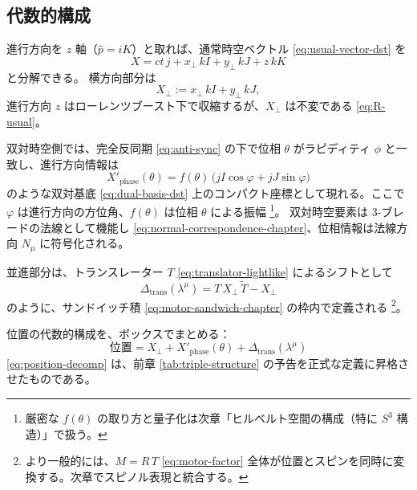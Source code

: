 \documentclass[dvipdfmx,a4paper,oneside]{jsbook}
\numberwithin{equation}{chapter}
\begin{document}
\subsection{代数的構成}

進行方向を \(z\) 軸（\(\hat{p} = iK\)）と取れば、通常時空ベクトル \eqref{eq:usual-vector-dst} を
\begin{equation}
  X = ct\, j + x_\perp\, kI + y_\perp\, kJ + z\, kK
  \label{eq:X-perp-decomp}
\end{equation}
と分解できる。
横方向部分は
\begin{equation}
  X_\perp := x_\perp\, kI + y_\perp\, kJ,
  \label{eq:X-perp}
\end{equation}
進行方向 \(z\) はローレンツブースト下で収縮するが、\(X_\perp\) は不変である \eqref{eq:R-usual}。

双対時空側では、完全反同期 \eqref{eq:anti-sync} の下で位相 \(\theta\) がラピディティ \(\phi\) と一致し、進行方向情報は
\begin{equation}
  X'_{\mathrm{phase}}(\theta)
  = f(\theta)\,\bigl(jI\cos\varphi + jJ\sin\varphi\bigr)
  \label{eq:X-phase}
\end{equation}
のような双対基底 \eqref{eq:dual-basis-dst} 上のコンパクト座標として現れる。ここで \(\varphi\) は進行方向の方位角、\(f(\theta)\) は位相 \(\theta\) による振幅 \footnote{厳密な \(f(\theta)\) の取り方と量子化は次章「ヒルベルト空間の構成（特に \(S^3\) 構造）」で扱う。}。
双対時空要素は 3-ブレードの法線として機能し \eqref{eq:normal-correspondence-chapter}、位相情報は法線方向 \(N_\mu\) に符号化される。

並進部分は、トランスレーター \(T\) \eqref{eq:translator-lightlike} によるシフトとして
\begin{equation}
  \Delta_{\mathrm{trans}}(\lambda^\mu)
  = T\, X_\perp\, \widetilde{T} - X_\perp
  \label{eq:delta-trans}
\end{equation}
のように、サンドイッチ積 \eqref{eq:motor-sandwich-chapter} の枠内で定義される \footnote{より一般的には、\(M = R\,T\) \eqref{eq:motor-factor} 全体が位置とスピンを同時に変換する。次章でスピノル表現と統合する。}。

位置の代数的構成を、ボックスでまとめる：
\begin{equation}
  \boxed{\;
  \text{位置}
  = X_\perp
  + X'_{\mathrm{phase}}(\theta)
  + \Delta_{\mathrm{trans}}(\lambda^\mu)
  \;}
  \label{eq:position-decomp}
\end{equation}
\eqref{eq:position-decomp} は、前章 \eqref{tab:triple-structure} の予告を正式な定義に昇格させたものである。
\end{document}
